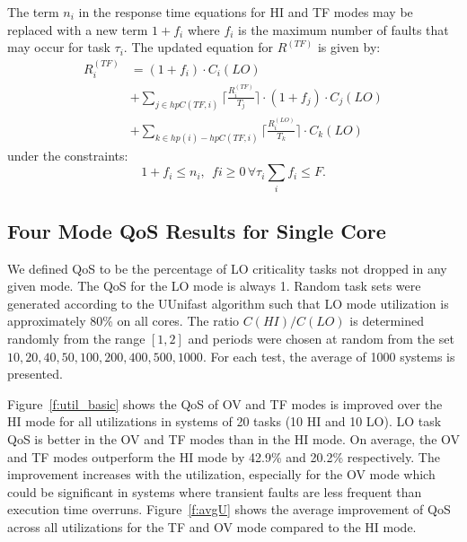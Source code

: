 	The term $n_i$ in the response time equations for HI and TF modes may be replaced with a new term $1 + f_i$ where $f_i$ is the maximum number of faults that may occur for task $\tau_i$. The updated equation for $R^{(TF)}$ is given by:
	\begin{equation}\label{eq:mode3new}
\begin{aligned}
R_i^{(TF)} & = (1+f_i) \cdot C_i(LO) \\
&  +\sum_{j \in hpC(TF,i)}\Big\lceil\frac{R_i^{(TF)}}{T_j}\Big\rceil \cdot (1+f_j) \cdot C_j(LO) \\
&  +\sum_{k \in hp(i)-hpC(TF,i)}\Big\lceil\frac{R_i^{(LO)}}{T_k}\Big\rceil \cdot C_k(LO)
\end{aligned}
\end{equation}
under the constraints:
\begin{subequations}
\begin{equation}
1+f_i \le n_i, \ \ fi \ge 0 \,  \forall \tau_i
\end{equation}
\begin{equation}
\sum_i{f_i} \le F.
\end{equation}
\end{subequations}

\subsection{Four Mode QoS Results for Single Core}

	We defined QoS to be the percentage of LO criticality tasks not dropped in any given mode. The QoS for the LO mode is always 1. Random task sets were generated according to the UUnifast algorithm \cite{bini2005measuring} such that LO mode utilization is approximately 80\% on all cores. The ratio $C(HI)/C(LO)$ is determined randomly from the range $[1,2]$ and periods were chosen at random from the set ${10,20,40,50,100,200,400,500,1000}$. For each test, the average of 1000 systems is presented.


	Figure~\ref{f:util_basic} shows the QoS of OV and TF modes is improved over the HI mode for all utilizations in systems of 20 tasks (10 HI and 10 LO). LO task QoS is better in the OV and TF modes than in the HI mode. On average, the OV and TF modes outperform the HI mode by 42.9\% and 20.2\% respectively. The improvement increases with the utilization, especially for the OV mode which could be significant in systems where transient faults are less frequent than execution time overruns. Figure~\ref{f:avgU} shows the average improvement of QoS across all utilizations for the TF and OV mode compared to the HI mode.
	

